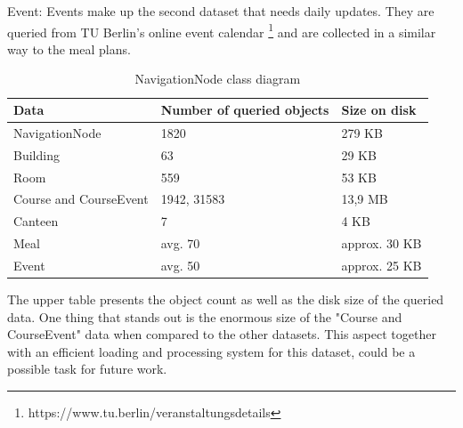 Event: Events make up the second dataset that needs daily updates. They are queried from TU Berlin's online event calendar \footnote{https://www.tu.berlin/veranstaltungsdetails} and are collected in a similar way to the meal plans.


\begin{table}[!ht]
	\small
	\centering
	\begin{tabular}{|l|l|l|}
		\hline
		\textbf{Data}           & \textbf{Number of queried objects}     	& \textbf{Size on disk} 		\\
		\hline
        NavigationNode          & 1820	              					 	& 279 KB                        \\
		\hline
        Building                & 63              							& 29 KB                         \\
		\hline
		Room               		& 559              							& 53 KB                         \\
		\hline
		Course and CourseEvent 	& 1942, 31583              					& 13,9 MB                      	\\
		\hline
		Canteen    				& 7              							& 4 KB                          \\
		\hline
		Meal    				& avg. 70              						& approx. 30 KB                 \\
		\hline
		Event    				& avg. 50              						& approx. 25 KB               	\\
		\hline
	\end{tabular}
	\caption{NavigationNode class diagram}
\end{table}

The upper table presents the object count as well as the disk size of the queried data. One thing that stands out is the enormous size of the "Course and CourseEvent" data when compared to the other datasets. This aspect together with an efficient loading and processing system for this dataset, could be a possible task for future work.

